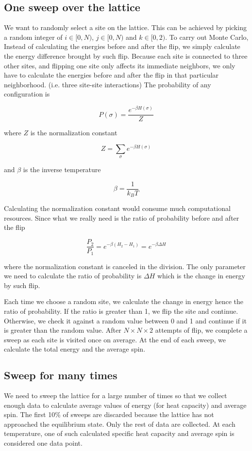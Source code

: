 \documentclass{article}
\begin{document}
\subsection{One sweep over the lattice}
\label{sec-2-2}

We want to randomly select a site on the lattice. This can be
achieved by picking a random integer of $i \in [0, N)$, $j \in [0,
   N)$ and $k \in [0, 2)$. To carry out Monte Carlo, Instead of
calculating the energies before and after the flip, we simply
calculate the energy difference brought by such flip. Because each
site is connected to three other sites, and flipping one site only
affects its immediate neighbors, we only have to calculate the
energies before and after the flip in that particular
neighborhood. (i.e. three site-site interactions) The probability
of any configuration is

$$P(\sigma) = \frac{e^{-\beta H(\sigma)}}{Z}$$

where $Z$ is the normalization constant

$$Z = \sum_{\sigma} e^{-\beta H(\sigma)}$$

and $\beta$ is the inverse temperature

$$\beta = \frac{1}{k_B T}$$

Calculating the normalization constant would consume much
computational resources. Since what we really need is the ratio of
probability before and after the flip

$$\frac{P_2}{P_1} = e^{-\beta (H_2 - H_1)} = e^{-\beta \Delta H}$$

where the normalization constant is canceled in the division. The
only parameter we need to calculate the ratio of probability is
$\Delta H$ which is the change in energy by such flip.

Each time we choose a random site, we calculate the change in
energy hence the ratio of probability. If the ratio is greater than
1, we flip the site and continue. Otherwise, we check it against a
random value between 0 and 1 and continue if it is greater than the
random value. After $N \times N \times 2$ attempts of flip, we
complete a sweep as each site is visited once on average. At the
end of each sweep, we calculate the total energy and the average spin.

\subsection{Sweep for many times}
\label{sec-2-3}

We need to sweep the lattice for a large number of times so that we
collect enough data to calculate average values of energy (for heat
capacity) and average spin. The first 10\% of sweeps are discarded
because the lattice has not approached the equilibrium state. Only
the rest of data are collected. At each temperature, one of such
calculated specific heat capacity and average spin is considered
one data point.
\end{document}
